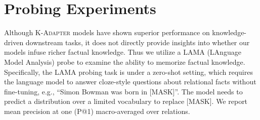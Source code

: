 \documentclass[11pt,a4paper]{article}
\begin{document}
\section{Probing Experiments}
\label{probing_experiments}
Although \textsc{K-Adapter} models have shown superior performance on knowledge-driven downstream tasks, it does not directly provide insights into whether our models infuse richer factual knowledge. Thus we utilize a LAMA (LAnguage Model Analysis) probe \citep{petroni2019language} to examine the ability to memorize factual knowledge. Specifically, the LAMA probing task is under a zero-shot setting, which requires the language model to answer cloze-style questions about relational facts without fine-tuning, e.g., ``Simon Bowman was born in [MASK]''. The model needs to predict a distribution over a limited vocabulary to replace [MASK]. We report mean precision at one (P@1) macro-averaged over relations.





\begin{table*}[h]
\centering
\small


\caption{P@1 on LAMA and LAMA-UHN across Google-RE and T-REx corpora. }
\label{tab:lama}
\end{table*}
\end{document}
